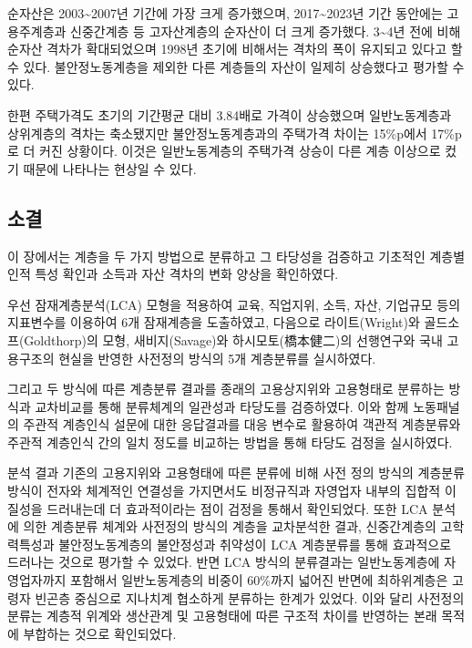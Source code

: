 \documentclass[
  letterpaper,
  DIV=11,
  numbers=noendperiod]{scrartcl}
\begin{document}
순자산은 2003\textasciitilde2007년 기간에 가장 크게 증가했으며,
2017\textasciitilde2023년 기간 동안에는 고용주계층과 신중간계층 등
고자산계층의 순자산이 더 크게 증가했다. 3\textasciitilde4년 전에 비해
순자산 격차가 확대되었으며 1998년 초기에 비해서는 격차의 폭이 유지되고
있다고 할 수 있다. 불안정노동계층을 제외한 다른 계층들의 자산이 일제히
상승했다고 평가할 수 있다.

한편 주택가격도 초기의 기간평균 대비 3.84배로 가격이 상승했으며
일반노동계층과 상위계층의 격차는 축소됐지만 불안정노동계층과의 주택가격
차이는 15\%p에서 17\%p로 더 커진 상황이다. 이것은 일반노동계층의
주택가격 상승이 다른 계층 이상으로 컸기 때문에 나타나는 현상일 수 있다.

\subsection{소결}\label{uxc18cuxacb0-1}

이 장에서는 계층을 두 가지 방법으로 분류하고 그 타당성을 검증하고
기초적인 계층별 인적 특성 확인과 소득과 자산 격차의 변화 양상을
확인하였다.

우선 잠재계층분석(LCA) 모형을 적용하여 교육, 직업지위, 소득, 자산,
기업규모 등의 지표변수를 이용하여 6개 잠재계층을 도출하였고, 다음으로
라이트(Wright)와 골드소프(Goldthorp)의 모형, 새비지(Savage)와
하시모토(橋本健二)의 선행연구와 국내 고용구조의 현실을 반영한 사전정의
방식의 5개 계층분류를 실시하였다.

그리고 두 방식에 따른 계층분류 결과를 종래의 고용상지위와 고용형태로
분류하는 방식과 교차비교를 통해 분류체계의 일관성과 타당도를 검증하였다.
이와 함께 노동패널의 주관적 계층인식 설문에 대한 응답결과를 대응 변수로
활용하여 객관적 계층분류와 주관적 계층인식 간의 일치 정도를 비교하는
방법을 통해 타당도 검정을 실시하였다.

분석 결과 기존의 고용지위와 고용형태에 따른 분류에 비해 사전 정의 방식의
계층분류 방식이 전자와 체계적인 연결성을 가지면서도 비정규직과 자영업자
내부의 집합적 이질성을 드러내는데 더 효과적이라는 점이 검정을 통해서
확인되었다. 또한 LCA 분석에 의한 계층분류 체계와 사전정의 방식의 계층을
교차분석한 결과, 신중간계층의 고학력특성과 불안정노동계층의 불안정성과
취약성이 LCA 계층분류를 통해 효과적으로 드러나는 것으로 평가할 수
있었다. 반면 LCA 방식의 분류결과는 일반노동계층에 자영업자까지 포함해서
일반노동계층의 비중이 60\%까지 넓어진 반면에 최하위계층은 고령자 빈곤층
중심으로 지나치계 협소하게 분류하는 한계가 있었다. 이와 달리 사전정의
분류는 계층적 위계와 생산관계 및 고용형태에 따른 구조적 차이를 반영하는
본래 목적에 부합하는 것으로 확인되었다.
\end{document}
